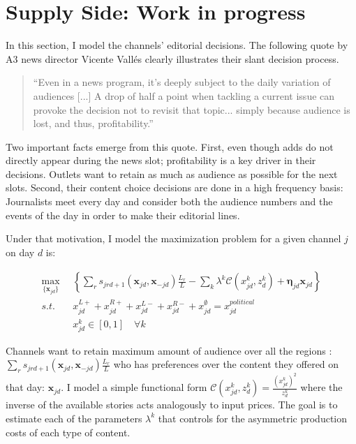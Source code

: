 \documentclass[12pt]{article}
\begin{document}
	\section{Supply Side: Work in progress}
	
	\label{sec:supply}



	
	In this section, I model the channels' editorial decisions. The following quote by A3 news director Vicente Vallés clearly illustrates their slant decision process. 
	\begin{quote}
		``Even in a news program, it’s deeply subject to the daily variation of audiences [...] A drop of half a point when tackling a current issue can provoke the decision not to revisit that topic... simply because audience is lost, and thus, profitability.''
	\end{quote}
	\hspace*{}
	
Two important facts emerge from this quote. First, even though adds do not directly appear during the news slot; profitability is a key driver in their decisions. Outlets want to retain as much as audience as possible for the next slots. Second, their content choice decisions are done in a high frequency basis: Journalists meet every day and consider both the audience numbers and the events of the day in order to make their editorial lines. 
	
	Under that motivation, I model 	the maximization problem for a  given channel $j$ on  day $d$ is:
	
	\begin{equation}\label{eq:payoffs}
		\begin{aligned}
			\max_{\{\mathbf{x}_{jd}\}}   & \left\{   \sum_{r}s_{jrd+1}(\bm{x}_{jd}, \bm{x}_{-jd})\frac{L_r}{L} - \sum_k {\lambda^k}\mathcal{C}({x}^k_{jd}, {z}^k_d)+ \bm{\eta}_{jd}\bm{x}_{jd} \right\}\\
			s.t.   \quad &   x_{jd}^{L+} +x_{jd}^{R+} + x_{jd}^{L-} + x_{jd}^{R-} + x_{jd}^{\emptyset} = x_{jd}^{political}\\
			& x_{jd}^k \in [0,1] \quad \forall k
		\end{aligned}
	\end{equation} 
	
	
Channels want to retain maximum amount of audience over all the regions :$\sum_{r}s_{jrd+1}(\bm{x}_{jd}, \bm{x}_{-jd})\frac{L_r}{L} $ who has preferences over the content they offered on that day:  $\mathbf{x}_{jd}$. I model a simple functional form $ \mathcal{C}({x}_{jd}^k, {z}_d^k) = \frac{(x_{jd}^k) ^2}{z_d^k}$ where the inverse of the available stories acts analogously to input prices. The goal is to estimate each of the parameters $\lambda^k$ that controls for the asymmetric production costs of each type of content. 
\end{document}
